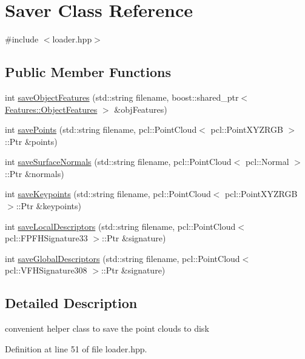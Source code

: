 \hypertarget{class_saver}{}\section{Saver Class Reference}
\label{class_saver}


{\ttfamily \#include $<$loader.\+hpp$>$}

\subsection*{Public Member Functions}
\begin{DoxyCompactItemize}
\item 
int \hyperlink{class_saver_a9d4eb8f7475a1392995cdb24d5b1df12}{save\+Object\+Features} (std\+::string filename, boost\+::shared\+\_\+ptr$<$ \hyperlink{struct_features_1_1_object_features}{Features\+::\+Object\+Features} $>$ \&obj\+Features)
\item 
int \hyperlink{class_saver_a7cb13afc54e63deccb5592a9cafcf023}{save\+Points} (std\+::string filename, pcl\+::\+Point\+Cloud$<$ pcl\+::\+Point\+X\+Y\+Z\+R\+GB $>$\+::Ptr \&points)
\item 
int \hyperlink{class_saver_ae495a4a2592cd981a4085b35f9645d32}{save\+Surface\+Normals} (std\+::string filename, pcl\+::\+Point\+Cloud$<$ pcl\+::\+Normal $>$\+::Ptr \&normals)
\item 
int \hyperlink{class_saver_a11cd83568c660254febecb5cdbeca9e6}{save\+Keypoints} (std\+::string filename, pcl\+::\+Point\+Cloud$<$ pcl\+::\+Point\+X\+Y\+Z\+R\+GB $>$\+::Ptr \&keypoints)
\item 
int \hyperlink{class_saver_a40c302f75d3721d2861a8e93685415ce}{save\+Local\+Descriptors} (std\+::string filename, pcl\+::\+Point\+Cloud$<$ pcl\+::\+F\+P\+F\+H\+Signature33 $>$\+::Ptr \&signature)
\item 
int \hyperlink{class_saver_a19a78a945fdc1da9193d46054a6ad80a}{save\+Global\+Descriptors} (std\+::string filename, pcl\+::\+Point\+Cloud$<$ pcl\+::\+V\+F\+H\+Signature308 $>$\+::Ptr \&signature)
\end{DoxyCompactItemize}


\subsection{Detailed Description}
convenient helper class to save the point clouds to disk 

Definition at line 51 of file loader.\+hpp.



